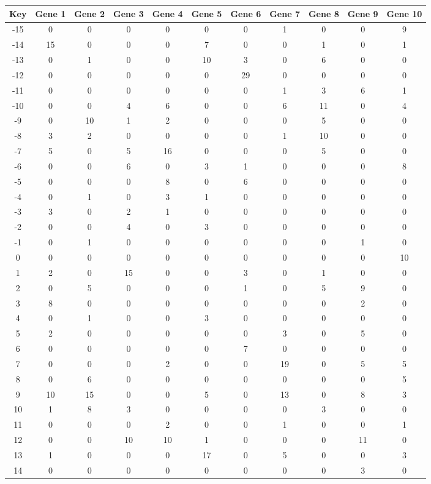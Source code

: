 \begin{tabular}{|c|c|c|c|c|c|c|c|c|c|c|}
\hline
Key & Gene 1 & Gene 2 & Gene 3 & Gene 4 & Gene 5 & Gene 6 & Gene 7 & Gene 8 & Gene 9 & Gene 10 \\
\hline
-15 & 0 & 0 & 0 & 0 & 0 & 0 & 1 & 0 & 0 & 9 \\
-14 & 15 & 0 & 0 & 0 & 7 & 0 & 0 & 1 & 0 & 1 \\
-13 & 0 & 1 & 0 & 0 & 10 & 3 & 0 & 6 & 0 & 0 \\
-12 & 0 & 0 & 0 & 0 & 0 & 29 & 0 & 0 & 0 & 0 \\
-11 & 0 & 0 & 0 & 0 & 0 & 0 & 1 & 3 & 6 & 1 \\
-10 & 0 & 0 & 4 & 6 & 0 & 0 & 6 & 11 & 0 & 4 \\
-9 & 0 & 10 & 1 & 2 & 0 & 0 & 0 & 5 & 0 & 0 \\
-8 & 3 & 2 & 0 & 0 & 0 & 0 & 1 & 10 & 0 & 0 \\
-7 & 5 & 0 & 5 & 16 & 0 & 0 & 0 & 5 & 0 & 0 \\
-6 & 0 & 0 & 6 & 0 & 3 & 1 & 0 & 0 & 0 & 8 \\
-5 & 0 & 0 & 0 & 8 & 0 & 6 & 0 & 0 & 0 & 0 \\
-4 & 0 & 1 & 0 & 3 & 1 & 0 & 0 & 0 & 0 & 0 \\
-3 & 3 & 0 & 2 & 1 & 0 & 0 & 0 & 0 & 0 & 0 \\
-2 & 0 & 0 & 4 & 0 & 3 & 0 & 0 & 0 & 0 & 0 \\
-1 & 0 & 1 & 0 & 0 & 0 & 0 & 0 & 0 & 1 & 0 \\
0 & 0 & 0 & 0 & 0 & 0 & 0 & 0 & 0 & 0 & 10 \\
1 & 2 & 0 & 15 & 0 & 0 & 3 & 0 & 1 & 0 & 0 \\
2 & 0 & 5 & 0 & 0 & 0 & 1 & 0 & 5 & 9 & 0 \\
3 & 8 & 0 & 0 & 0 & 0 & 0 & 0 & 0 & 2 & 0 \\
4 & 0 & 1 & 0 & 0 & 3 & 0 & 0 & 0 & 0 & 0 \\
5 & 2 & 0 & 0 & 0 & 0 & 0 & 3 & 0 & 5 & 0 \\
6 & 0 & 0 & 0 & 0 & 0 & 7 & 0 & 0 & 0 & 0 \\
7 & 0 & 0 & 0 & 2 & 0 & 0 & 19 & 0 & 5 & 5 \\
8 & 0 & 6 & 0 & 0 & 0 & 0 & 0 & 0 & 0 & 5 \\
9 & 10 & 15 & 0 & 0 & 5 & 0 & 13 & 0 & 8 & 3 \\
10 & 1 & 8 & 3 & 0 & 0 & 0 & 0 & 3 & 0 & 0 \\
11 & 0 & 0 & 0 & 2 & 0 & 0 & 1 & 0 & 0 & 1 \\
12 & 0 & 0 & 10 & 10 & 1 & 0 & 0 & 0 & 11 & 0 \\
13 & 1 & 0 & 0 & 0 & 17 & 0 & 5 & 0 & 0 & 3 \\
14 & 0 & 0 & 0 & 0 & 0 & 0 & 0 & 0 & 3 & 0 \\
\hline
\end{tabular}